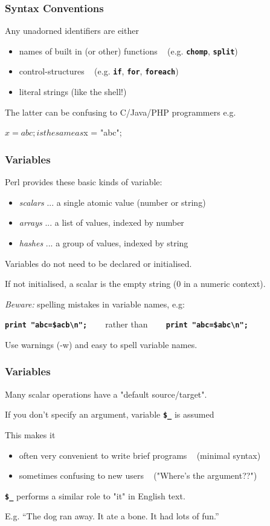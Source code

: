 \begin{frame}[fragile]
\frametitle{Syntax Conventions}
Any unadorned identifiers are either
\begin{itemize}
\item  names of built in (or other) functions ~ (e.g. \textbf{\tt{chomp}}, \textbf{\tt{split}})
\item  control-structures ~ (e.g. \textbf{\tt{if}}, \textbf{\tt{for}}, \textbf{\tt{foreach}})
\item  literal strings (like the shell!)
\end{itemize}
The latter can be confusing to C/Java/PHP programmers e.g.
\begin{perl}
    $x = abc;   is the same as   $x = "abc";
\end{perl}

\end{frame}

\begin{frame}
\frametitle{Variables}
Perl provides these basic kinds of variable:

\begin{itemize}
\item  {\em{scalars}} ... a single atomic value (number or string)
\item  {\em{arrays}} ... a list of values, indexed by number
\item  {\em{hashes}} ... a group of values, indexed by string
\end{itemize}

Variables do not need to be declared or initialised.

If not initialised, a scalar is the empty string {\small (0 in a numeric context)}.

{\em{Beware:}} spelling mistakes in variable names, e.g:

\begin{center}
\textbf{\tt{print "abc=\$acb{\textbackslash}n";}}  ~~~ rather than ~~~ \textbf{\tt{print "abc=\$abc{\textbackslash}n";}}
\end{center}

Use warnings (-w) and easy to spell variable names.

\end{frame}

\begin{frame}
\frametitle{Variables}
Many scalar operations have a "default source/target".

If you don't specify an argument,  variable \textbf{\tt{\$\_}} is assumed

This makes it
\begin{itemize}
\item  often very convenient to write brief programs
	~ {\small (minimal syntax)}
\item  sometimes confusing to new users
	~ {\small ("Where's the argument??")}
\end{itemize}

\textbf{\tt{\$\_}} performs a similar role to "it" in English text.

E.g. ``The dog ran away. It ate a bone. It had lots of fun.''

\end{frame}

